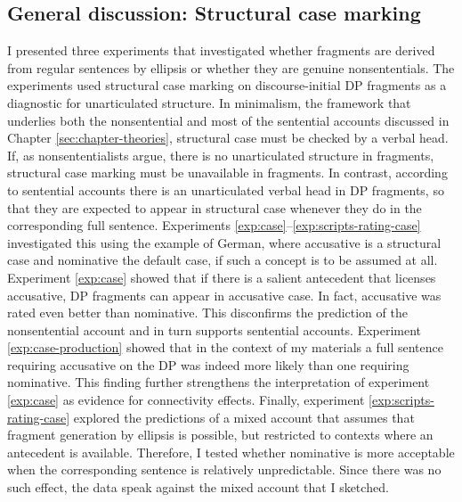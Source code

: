 \subsection{General discussion: Structural case marking}\largerpage
I presented three experiments that investigated whether fragments are derived from regular sentences by ellipsis or whether they are genuine nonsententials. The experiments used structural case marking on discourse-initial DP fragments as a diagnostic for unarticulated structure. In minimalism, the framework that underlies both the nonsentential and most of the sentential accounts discussed in Chapter \ref{sec:chapter-theories}, structural case must be checked by a verbal head. If, as nonsententialists argue, there is no unarticulated structure in fragments, structural case marking must be unavailable in fragments. In contrast, according to sentential accounts there is an unarticulated verbal head in DP fragments, so that they are expected to appear in structural case whenever they do in the corresponding full sentence. Experiments \ref{exp:case}--\ref{exp:scripts-rating-case} investigated this using the example of German, where accusative is a structural case and nominative the default case, if such a concept is to be assumed at all. Experiment \ref{exp:case} showed that if there is a salient antecedent that licenses accusative, DP fragments can appear in accusative case. In fact, accusative was rated even better than nominative. This disconfirms the prediction of the nonsentential account and in turn supports sentential accounts. Experiment \ref{exp:case-production} showed that in the context of my materials a full sentence requiring accusative on the DP was indeed more likely than one requiring nominative. This finding further strengthens the interpretation of experiment \ref{exp:case} as evidence for connectivity effects. Finally, experiment \ref{exp:scripts-rating-case} explored the predictions of a mixed account that assumes that fragment generation by ellipsis is possible, but restricted to contexts where an antecedent is available. Therefore, I tested whether nominative is more acceptable when the corresponding sentence is relatively unpredictable. Since there was no such effect, the data speak against the mixed account that I sketched.


